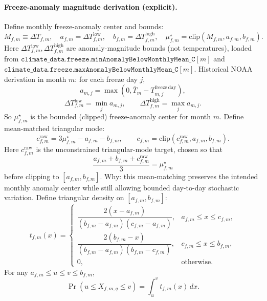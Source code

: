 \documentclass[11pt]{article}
\begin{document}
\paragraph{Freeze-anomaly magnitude derivation (explicit).}
Define monthly freeze-anomaly center and bounds:
\begin{equation}
\label{eq:freeze_bounds_params}
M_{f,m}\equiv \Delta T_{f,m},
\quad
a_{f,m}=\Delta T_{f,m}^{\mathrm{low}},
\quad
b_{f,m}=\Delta T_{f,m}^{\mathrm{high}},
\quad
\mu_{f,m}^{\star}=\mathrm{clip}(M_{f,m},a_{f,m},b_{f,m}).
\end{equation}
Here \(\Delta T_{f,m}^{\mathrm{low}},\Delta T_{f,m}^{\mathrm{high}}\) are anomaly-magnitude bounds (not temperatures), loaded from
\(\texttt{climate\_data.freeze.minAnomalyBelowMonthlyMean\_C}[m]\) and
\(\texttt{climate\_data.freeze.maxAnomalyBelowMonthlyMean\_C}[m]\).
Historical NOAA derivation in month \(m\): for each freeze day \(j\),
\[
a_{m,j}=\max\!\left(0,\bar T_m-T^{\mathrm{freeze\ day}}_{m,j}\right),
\]
\[
\Delta T_{f,m}^{\mathrm{low}}=\min_j a_{m,j},\qquad
\Delta T_{f,m}^{\mathrm{high}}=\max_j a_{m,j}.
\]
So \(\mu_{f,m}^{\star}\) is the bounded (clipped) freeze-anomaly center for month \(m\).
Define mean-matched triangular mode:
\begin{equation}
\label{eq:freeze_std_normal_defs}
c_{f,m}^{\mathrm{raw}}=3\mu_{f,m}^{\star}-a_{f,m}-b_{f,m},
\qquad
c_{f,m}=\mathrm{clip}(c_{f,m}^{\mathrm{raw}},a_{f,m},b_{f,m}).
\end{equation}
Here \(c_{f,m}^{\mathrm{raw}}\) is the unconstrained triangular-mode target, chosen so that
\[
\frac{a_{f,m}+b_{f,m}+c_{f,m}^{\mathrm{raw}}}{3}=\mu_{f,m}^{\star}
\]
before clipping to \([a_{f,m},b_{f,m}]\).
Why: this mean-matching preserves the intended monthly anomaly center while still allowing bounded day-to-day stochastic variation.
Define triangular density on \([a_{f,m},b_{f,m}]\):
\begin{equation}
\label{eq:freeze_truncnorm_density}
t_{f,m}(x)=
\begin{cases}
\dfrac{2(x-a_{f,m})}{(b_{f,m}-a_{f,m})(c_{f,m}-a_{f,m})}, & a_{f,m}\le x\le c_{f,m},\\[6pt]
\dfrac{2(b_{f,m}-x)}{(b_{f,m}-a_{f,m})(b_{f,m}-c_{f,m})}, & c_{f,m}\le x\le b_{f,m},\\[6pt]
0, & \text{otherwise}.
\end{cases}
\end{equation}
For any \(a_{f,m}\le u\le v\le b_{f,m}\),
\begin{equation}
\label{eq:freeze_prob_integral}
\Pr(u\le X_{f,m,q}\le v)=\int_u^v t_{f,m}(x)\,dx.
\end{equation}
\end{document}
